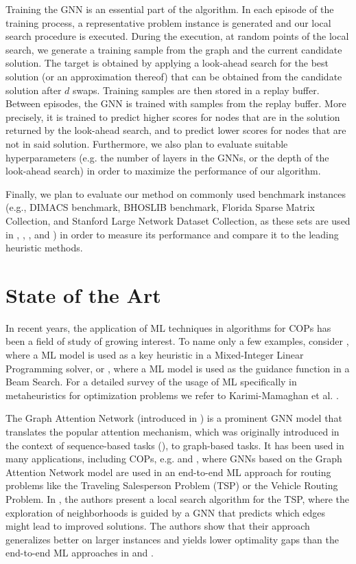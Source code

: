 \documentclass [11pt]{article}
\begin{document}
Training the GNN is an essential part of the algorithm. In each episode of the training process, a representative problem instance is generated and our local search procedure is executed. During the execution, at random points of the local search, we generate a training sample from the graph and the current candidate solution. The target is obtained by applying a look-ahead search for the best solution (or an approximation thereof) that can be obtained from the candidate solution after $d$ swaps. Training samples are then stored in a replay buffer. Between episodes, the GNN is trained with samples from the replay buffer. More precisely, it is trained to predict higher scores for nodes that are in the solution returned by the look-ahead search, and to predict lower scores for nodes that are not in said solution. Furthermore, we also plan to evaluate suitable hyperparameters (e.g. the number of layers in the GNNs, or the depth of the look-ahead search) in order to maximize the performance of our algorithm. 

Finally, we plan to evaluate our method on commonly used benchmark instances (e.g., DIMACS benchmark, BHOSLIB benchmark, Florida Sparse Matrix Collection, and Stanford Large Network Dataset Collection, as these sets are used in \cite{djeddi_extension_2019}, \cite{pinto_biased_2018}, \cite{chen_nuqclq_2021}, and \cite{zhou_opposition-based_2020}) in order to measure its performance and compare it to the leading heuristic methods. 

\section{State of the Art}

In recent years, the application of ML techniques in algorithms for COPs has been a field of study of growing interest. To name only a few examples, consider \cite{Zarpellon2021}, where a ML model is used as a key heuristic in a Mixed-Integer Linear Programming solver, or \cite{Huber2021}, where a ML model is used as the guidance function in a Beam Search. For a detailed survey of the usage of ML specifically in metaheuristics for optimization problems we refer to Karimi-Mamaghan et al. \cite{KARIMIMAMAGHAN2022393}. 

 The Graph Attention Network (introduced in \cite{Velickovic2018}) is a prominent GNN model that translates the popular attention mechanism, which was originally introduced in the context of sequence-based tasks (\cite{Bahdanau2015}), to graph-based tasks. It has been used in many applications, including COPs, e.g. \cite{Kool2019} and \cite{Joshi2021}, where GNNs based on the Graph Attention Network model are used in an end-to-end ML approach for routing problems like the Traveling Salesperson Problem (TSP) or the Vehicle Routing Problem. In \cite{Hudson2021}, the authors present a local search algorithm for the TSP, where the exploration of neighborhoods is guided by a GNN that predicts which edges might lead to improved solutions. The authors show that their approach generalizes better on larger instances and yields lower optimality gaps than the end-to-end ML approaches in \cite{Kool2019} and \cite{Joshi2021}.  
\end{document}
